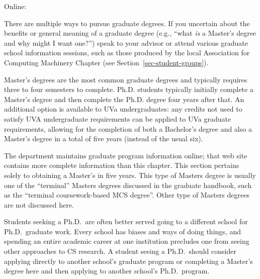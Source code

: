 \noindent Online: \csmsURL





There are multiple ways to pursue graduate degrees. If you uncertain about
the benefits or general meaning of a graduate degree (e.g., ``what
\emph{is} a Master's degree and why might I want one?'') speak to your
advisor or attend various graduate school information sessions, such as
those produced by the local Association for Computing Machinery Chapter
(see Section~\ref{sec-student-groups}). 

Master's degrees are the most common graduate degrees and typically
requires three to four semesters to complete. Ph.D. students typically
initially complete a Master's degree and then complete the Ph.D. degree
four years after that. An additional option is available to UVa
undergraduates: any credits not used to satisfy UVA undergraduate
requirements can be applied to UVa graduate requirements, allowing for the
completion of both a Bachelor's degree and also a Master's degree in a
total of five years (instead of the usual six). 

The department maintains graduate program information
online\myurlFormatted{\csmsURL}; that
web site contains more complete information than this chapter.  This
section pertains solely to obtaining a Master's in five years. This type
of Masters degree is usually one of the ``terminal'' Masters degrees
discussed in the graduate handbook, such as the ``terminal coursework-based
MCS degree''. Other type of Masters degrees are not discussed here.

Students seeking a Ph.D.\ are often better served going to a different
school for Ph.D.\ graduate work. Every school has biases and ways of doing
things, and spending an entire academic career at one institution precludes
one from seeing other approaches to CS research. A student seeing a 
Ph.D.\ should consider applying directly to another school's graduate
program or completing a Master's degree here and then applying to another
school's Ph.D.\ program. 

